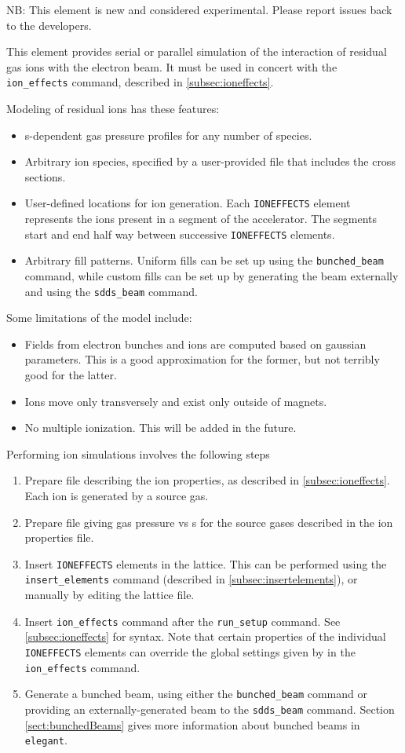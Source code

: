 NB: This element is new and considered experimental. Please report issues back to the developers.

This element provides serial or parallel simulation of the interaction of residual gas ions
with the electron beam.
It must be used in concert with the \verb|ion_effects| command, described in \ref{subsec:ioneffects}.

Modeling of residual ions has these features:
\begin{itemize}
\item s-dependent gas pressure profiles for any number of species.
\item Arbitrary ion species, specified by a user-provided file that includes the cross sections.
\item User-defined locations for ion generation. Each \verb|IONEFFECTS| element represents the
      ions present in a segment of the accelerator. The segments start and end half way between
      successive \verb|IONEFFECTS| elements.
\item Arbitrary fill patterns. Uniform fills can be set up using the \verb|bunched_beam| command,
      while custom fills can be set up by generating the beam externally and using the \verb|sdds_beam| command.
\end{itemize}

Some limitations of the model include:
\begin{itemize}
\item Fields from electron bunches and ions are computed based on gaussian parameters. 
      This is a good approximation for the former, but not terribly good for the latter.
\item Ions move only transversely and exist only outside of magnets.
\item No multiple ionization. This will be added in the future.
\end{itemize}

Performing ion simulations involves the following steps
\begin{enumerate}
\item Prepare file describing the ion properties, as described in \ref{subsec:ioneffects}.
  Each ion is generated by a source gas.
\item Prepare file giving gas pressure vs s for the source gases described in the ion 
  properties file.
\item Insert \verb|IONEFFECTS| elements in the lattice. This can be performed using the
  \verb|insert_elements| command (described in \ref{subsec:insertelements}), or
  manually by editing the lattice file.
\item Insert \verb|ion_effects| command after the \verb|run_setup| command. See
  \ref{subsec:ioneffects} for syntax.
  Note that certain properties of the individual \verb|IONEFFECTS| elements can override the
  global settings given by in the \verb|ion_effects| command.
\item Generate a bunched beam, using either the \verb|bunched_beam| command or providing
  an externally-generated beam to the \verb|sdds_beam| command. Section \ref{sect:bunchedBeams}
  gives more information about bunched beams in \verb|elegant|.
\end{enumerate}


